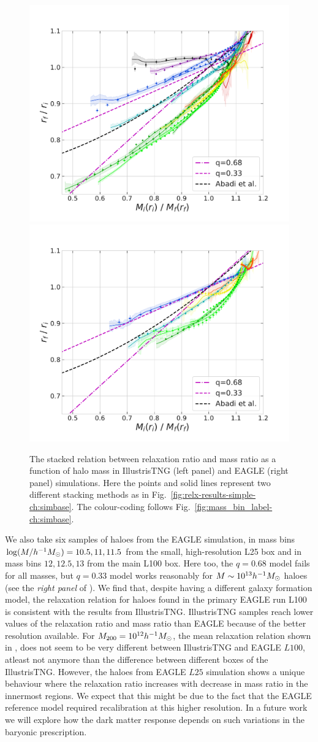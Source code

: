 \begin{figure}
\centering
\includegraphics[width=0.49\linewidth]{plots/fit_view_M_T.pdf}
\includegraphics[width=0.49\linewidth]{plots/fit_view_M_E.pdf}
\caption{The stacked relation between relaxation ratio and mass ratio as a function of halo mass in IllustrisTNG (left panel) and EAGLE (right panel) simulations. Here the points and solid lines represent two different stacking methods as in Fig.~\ref{fig:relx-results-simple-ch:simbase}. The colour-coding follows Fig.~\ref{fig:mass_bin_label-ch:simbase}.} 
\label{fig:fit-view-mass-indep-ch:simbase}
\end{figure}








We also take six samples of haloes from the EAGLE simulation, in mass bins $\log (M/h^{-1}M_{\odot}) = 10.5, 11,11.5$  from the small, high-resolution L25 box and in mass bins $12, 12.5, 13$ from the main L100 box. Here too, the $q=0.68$ model fails for all masses, but $q=0.33$ model works reasonably for  $M\sim10^{13} h^{-1}M_{\odot}$ haloes (see the \emph{right panel} of ). We find that, despite having a different galaxy formation model, the relaxation relation for haloes found in the primary EAGLE run L100 is consistent with the results from IllustrisTNG. 
IllustrisTNG samples reach lower values of the relaxation ratio and mass ratio than EAGLE because of the better resolution available. For $M_{200}=10^{12} h^{-1}M_{\odot}$, the mean relaxation relation shown in , does not seem to be very different between IllustrisTNG and EAGLE $L100$, atleast not anymore than the difference between different boxes of the IllustrisTNG. However, the haloes from EAGLE $L25$ simulation shows a unique behaviour where the relaxation ratio increases with decrease in mass ratio in the innermost regions. We expect that this might be due to the fact that the EAGLE reference model required recalibration at this higher resolution. In a future work we will explore how the dark matter response depends on such variations in the baryonic prescription.


